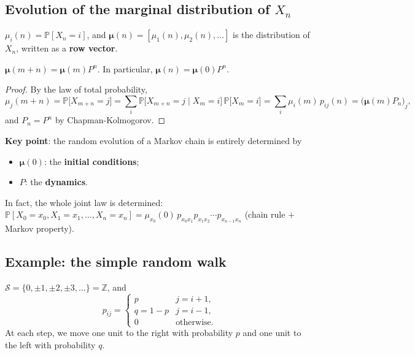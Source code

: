 \subsection{Evolution of the marginal distribution of $X_n$}

\begin{definition}
$\mu_i(n) = \mathbb{P}[X_n = i]$, and $\boldsymbol{\mu}(n) = [\mu_1(n), \mu_2(n), \dots]$ is the distribution of $X_n$, written as a \textbf{row vector}.
\end{definition}

\begin{theorem}[Lemma]
$\boldsymbol{\mu}(m+n) = \boldsymbol{\mu}(m) P^n$. In particular, $\boldsymbol{\mu}(n) = \boldsymbol{\mu}(0) P^n$.
\end{theorem}

\begin{proof}
By the law of total probability,
\[
\mu_j(m+n) = \mathbb{P}\big[X_{m+n} = j\big] = \sum_i \mathbb{P}\big[X_{m+n} = j \mid X_m = i\big]\,\mathbb{P}\big[X_m = i\big] = \sum_i \mu_i(m)\, p_{ij}(n) = \big(\boldsymbol{\mu}(m) P_n\big)_j,
\]
and $P_n = P^n$ by Chapman-Kolmogorov.
\end{proof}

\textbf{Key point}: the random evolution of a Markov chain is entirely determined by
\begin{itemize}
    \item $\boldsymbol{\mu}(0)$: the \textbf{initial conditions};
    \item $P$: the \textbf{dynamics}.
\end{itemize}
In fact, the whole joint law is determined: $\mathbb{P}[X_0 = x_0, X_1 = x_1, \dots, X_n = x_n] = \mu_{x_0}(0)\, p_{x_0x_1} p_{x_1x_2}\cdots p_{x_{n-1}x_n}$ (chain rule $+$ Markov property).

\subsection{Example: the simple random walk}

\begin{definition}
$\mathcal{S} = \{0, \pm1, \pm2, \pm3, \dots\} = \mathbb{Z}$, and
\[
p_{ij} = \begin{cases} p & j = i+1, \\ q = 1-p & j = i-1, \\ 0 & \text{otherwise.} \end{cases}
\]
At each step, we move one unit to the right with probability $p$ and one unit to the left with probability $q$.
\end{definition}

